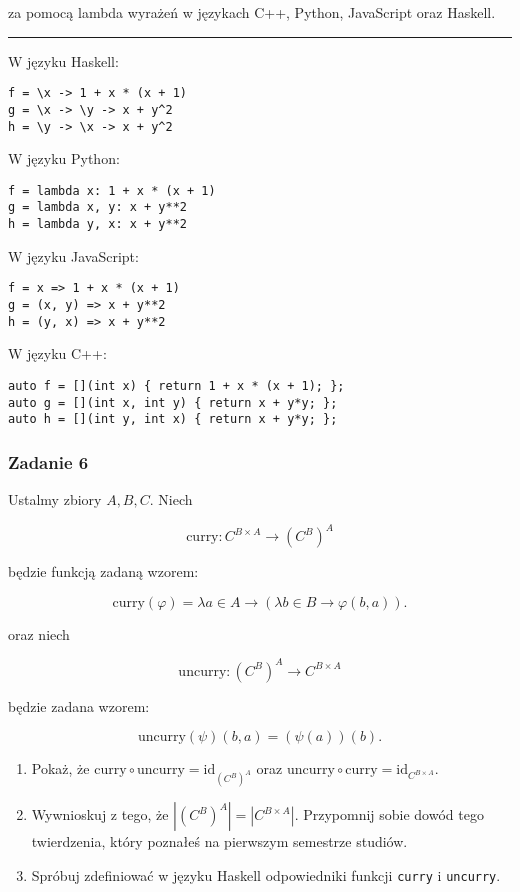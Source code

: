 \documentclass[11pt,a4paper]{article}
\begin{document}
za pomocą lambda wyrażeń w językach C++, Python, JavaScript oraz Haskell.
\bigskip
\hrule
\bigskip

W języku Haskell:
\begin{Verbatim}[frame=single]
f = \x -> 1 + x * (x + 1)
g = \x -> \y -> x + y^2
h = \y -> \x -> x + y^2
\end{Verbatim}

W języku Python:
\begin{Verbatim}[frame=single]
f = lambda x: 1 + x * (x + 1)
g = lambda x, y: x + y**2
h = lambda y, x: x + y**2
\end{Verbatim}

W języku JavaScript:
\begin{Verbatim}[frame=single]
f = x => 1 + x * (x + 1)
g = (x, y) => x + y**2
h = (y, x) => x + y**2
\end{Verbatim}

W języku C++:
\begin{Verbatim}[frame=single]
auto f = [](int x) { return 1 + x * (x + 1); };
auto g = [](int x, int y) { return x + y*y; };
auto h = [](int y, int x) { return x + y*y; };
\end{Verbatim}

\subsubsection{Zadanie 6}
Ustalmy zbiory \( A, B, C \). Niech

\[
\text{curry} : C^{B \times A} \to (C^B)^A
\]

będzie funkcją zadaną wzorem:

\[
\text{curry}(\varphi) = \lambda a \in A \to (\lambda b \in B \to \varphi(b, a)).
\]

oraz niech

\[
\text{uncurry} : (C^B)^A \to C^{B \times A}
\]

będzie zadana wzorem:

\[
\text{uncurry}(\psi)(b, a) = (\psi(a))(b).
\]

\begin{enumerate}
    \item Pokaż, że \( \text{curry} \circ \text{uncurry} = \text{id}_{(C^B)^A} \) oraz \( \text{uncurry} \circ \text{curry} = \text{id}_{C^{B \times A}} \).

    \item Wywnioskuj z tego, że \( |(C^B)^A| = |C^{B \times A}| \). Przypomnij sobie dowód tego twierdzenia, który poznałeś na pierwszym semestrze studiów.

    \item Spróbuj zdefiniować w języku Haskell odpowiedniki funkcji \texttt{curry} i \texttt{uncurry}.
\end{enumerate}
\end{document}
